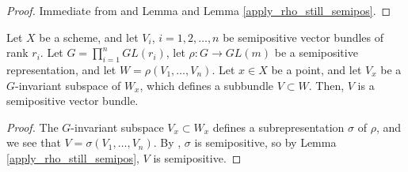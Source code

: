 \begin{proof}
Immediate from and Lemma  and Lemma \ref{apply_rho_still_semipos}.
\end{proof}

\begin{lemma}
Let $X$ be a scheme, and let $V_i$, $i=1,2,\ldots,n$ be semipositive vector bundles of rank $r_i$. Let $G=\prod_{i=1}^{n}GL(r_i)$, let $\rho:G\to GL(m)$ be a semipositive representation, and let $W=\rho(V_1,\ldots,V_n)$. Let $x\in X$ be a point, and let $V_x$ be a $G$-invariant subspace of $W_x$, which defines a subbundle $V\subset W$. Then, $V$ is a semipositive vector bundle.
\end{lemma}

\begin{proof}
The $G$-invariant subspace $V_x\subset W_x$ defines a subrepresentation $\sigma$ of $\rho$, and we see that $V=\sigma(V_1,\ldots,V_n)$. By , $\sigma$ is semipositive, so by Lemma \ref{apply_rho_still_semipos}, $V$ is semipositive.
\end{proof}








